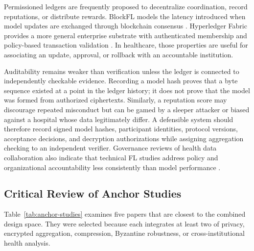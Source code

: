 Permissioned ledgers are frequently proposed to decentralize coordination, record reputations, or distribute rewards. BlockFL models the latency introduced when model updates are exchanged through blockchain consensus \cite{kim2020blockfl}. Hyperledger Fabric provides a more general enterprise substrate with authenticated membership and policy-based transaction validation \cite{androulaki2018hyperledger}. In healthcare, those properties are useful for associating an update, approval, or rollback with an accountable institution.

Auditability remains weaker than verification unless the ledger is connected to independently checkable evidence. Recording a model hash proves that a byte sequence existed at a point in the ledger history; it does not prove that the model was formed from authorized ciphertexts. Similarly, a reputation score may discourage repeated misconduct but can be gamed by a sleeper attacker or biased against a hospital whose data legitimately differ. A defensible system should therefore record signed model hashes, participant identities, protocol versions, acceptance decisions, and decryption authorizations while assigning aggregation checking to an independent verifier. Governance reviews of health data collaboration also indicate that technical FL studies address policy and organizational accountability less consistently than model performance \cite{eden2025governance}.

\subsection{Critical Review of Anchor Studies}

Table~\ref{tab:anchor-studies} examines five papers that are closest to the combined design space. They were selected because each integrates at least two of privacy, encrypted aggregation, compression, Byzantine robustness, or cross-institutional health analysis.

